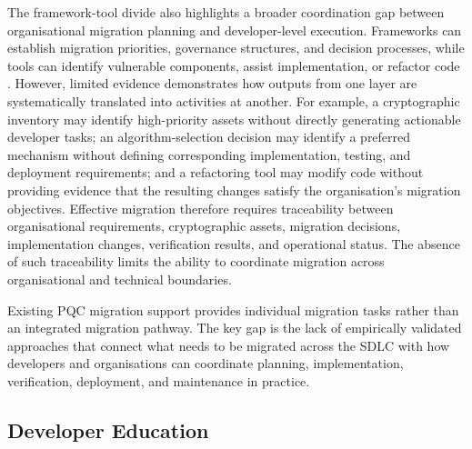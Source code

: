 \documentclass[letterpaper,twocolumn,10pt]{article}
\begin{document}
The framework-tool divide also highlights a broader coordination gap between organisational migration planning and developer-level execution. Frameworks can establish migration priorities, governance structures, and decision processes, while tools can identify vulnerable components, assist implementation, or refactor code \cite{Ana_MigFrDepen, Ana_MigFrameOrg, Ana_PMMP, Ana_rattanavipanon_toolchain_2025, Ana_android_Migr, Ana_ccPASTpqc, Ana_legacyToQuantumConvert}. However, limited evidence demonstrates how outputs from one layer are systematically translated into activities at another. For example, a cryptographic inventory may identify high-priority assets without directly generating actionable developer tasks; an algorithm-selection decision may identify a preferred mechanism without defining corresponding implementation, testing, and deployment requirements; and a refactoring tool may modify code without providing evidence that the resulting changes satisfy the organisation's migration objectives. Effective migration therefore requires traceability between organisational requirements, cryptographic assets, migration decisions, implementation changes, verification results, and operational status. The absence of such traceability limits the ability to coordinate migration across organisational and technical boundaries.

\begin{tcolorbox}[
title=\textbf{Takeaway},
colback=gray!5,
colframe=black,
boxrule=0.5pt,
arc=0.5mm,
left=0.5mm,
right=0.5mm,
top=0.5mm,
bottom=0.5mm
]
Existing PQC migration support provides individual migration tasks rather than an integrated migration pathway. The key gap is the lack of empirically validated approaches that connect what needs to be migrated across the SDLC with how developers and organisations can coordinate planning, implementation, verification, deployment, and maintenance in practice.
\end{tcolorbox}

\subsection{Developer Education}
\label{DisEduReady}
\end{document}
